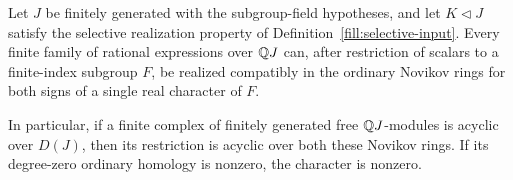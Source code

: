 \begin{proposition}\label{fill:progressive}
Let \(J\) be finitely generated with the subgroup-field hypotheses,
and let \(K\lhd J\) satisfy the selective realization property of
Definition~\ref{fill:selective-input}.
Every finite family of rational expressions over \(\mathbb Q J\) can,
after restriction of scalars to a finite-index subgroup \(F\),
be realized compatibly in the ordinary Novikov rings for both signs
of a single real character of \(F\).

In particular, if a finite complex of finitely generated free
\(\mathbb Q J\)-modules is acyclic over \(D(J)\), then its restriction is
acyclic over both these Novikov rings.  If its degree-zero ordinary
homology is nonzero, the character is nonzero.
\end{proposition}

